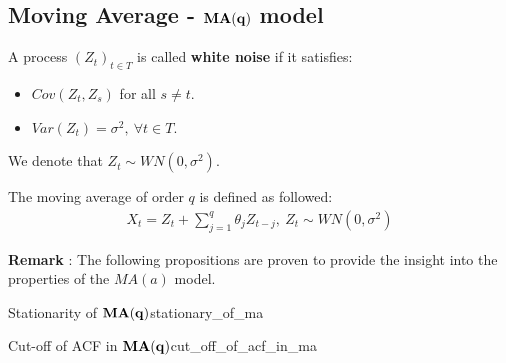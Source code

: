 \subsection{Moving Average - $\bf MA(q)$ model}
\begin{definition}
    A process $(Z_t)_{t\in T}$ is called \textbf{white noise} if it satisfies:
    \begin{itemize}
        \item $Cov(Z_t, Z_s)$ for all $s\ne t$.
        \item $Var(Z_t) = \sigma^2, \ \forall t\in T$.
    \end{itemize}

    \noindent We denote that $Z_t\sim WN(0, \sigma^2)$.
\end{definition}

\begin{definition}[$\bf MA(q)$ model]
    The moving average of order $q$ is defined as followed:
    \begin{align*}
        X_t = Z_t + \sum_{j=1}^q \theta_j Z_{t-j}, \ Z_t\sim WN(0,\sigma^2)
    \end{align*}
\end{definition}

\textbf{Remark} : The following propositions are proven to provide the insight into the properties of the $MA(a)$ model.

\begin{proposition}{Stationarity of $\bf MA(q)$}{stationary_of_ma}
    
\end{proposition}

\begin{proposition}{Cut-off of ACF in $\bf MA(q)$}{cut_off_of_acf_in_ma}
    
\end{proposition}
